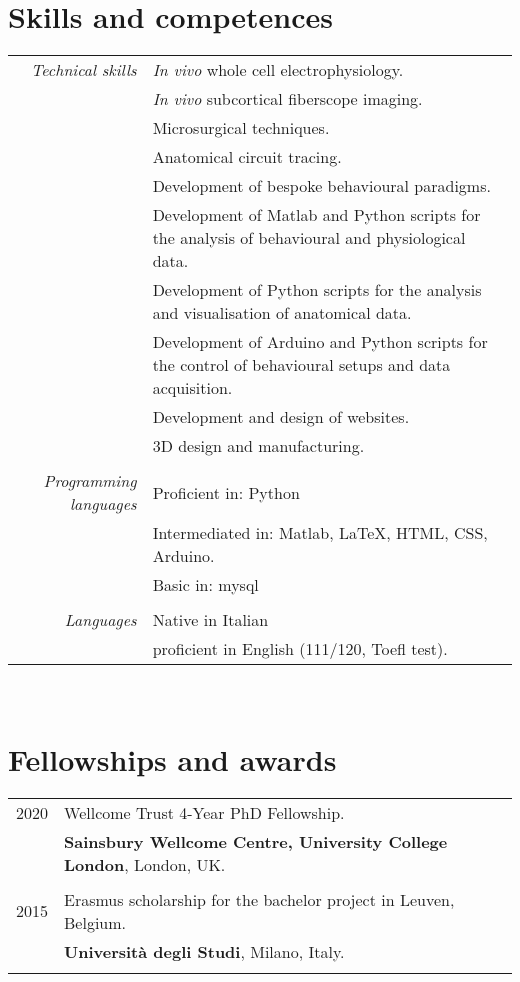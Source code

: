 \documentclass[a4paper,10pt]{article}
\begin{document}
\section{Skills and competences}
\begin{tabular}{r|p{11cm}}

    \textit{Technical skills} & \textit{In vivo} whole cell electrophysiology.  \\&
        \textit{In vivo} subcortical fiberscope imaging.  \\&
        Microsurgical techniques.  \\&
        Anatomical circuit tracing.  \\&
        Development of bespoke behavioural paradigms. \\&
        Development of Matlab and Python scripts for the analysis of behavioural and physiological data. \\&
        Development of Python scripts for the analysis and visualisation of anatomical data. \\&
        Development of Arduino and Python scripts for the control of behavioural setups and data acquisition. \\&
        Development and design of websites. \\&
        3D design and manufacturing.
        \\\multicolumn{2}{c}{} \\
     
  \textit{Programming languages} & Proficient in: Python \\&
        Intermediated in: Matlab, LaTeX, HTML, CSS, Arduino. \\&
        Basic in: mysql
         \\\multicolumn{2}{c}{} \\

  \textit{Languages} & Native in Italian \\&
        proficient in English (111/120, Toefl test).
\end{tabular}
\\

\section{Fellowships and awards}
\begin{tabular}{rl}	

    \textsc{2020}& Wellcome Trust 4-Year PhD Fellowship. \\& 
    \normalsize\textbf{Sainsbury Wellcome Centre, University College London}, London, UK.
    \\&\\

    \textsc{2015}& Erasmus scholarship for the bachelor project in Leuven, Belgium.  \\& 
    \normalsize\textbf{Università degli Studi}, Milano, Italy.
    \\&\\

\end{tabular}
\end{document}
